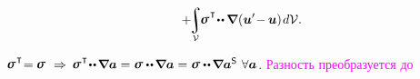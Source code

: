 \begin{multline*}
\begin{gathered}
+ \hspace{-0.3ex}
\scalebox{0.9}{$\displaystyle\integral\displaylimits_{\mathcal{V}}$} \hspace{-0.3ex}
\linearstress^{\hspace{.12ex}\T} \hspace{-0.4ex} \dotdotp \hspace{-0.1ex} \boldnabla \hspace{.1ex} ( \bm{u}' \hspace{-0.4ex} - \hspace{-0.1ex} \bm{u} ) \hspace{.2ex} d\mathcal{V}
.
\end{gathered}\hspace{-1em}
\end{multline*}

\vspace{-0.3em}\noindent
{}  ${\linearstress^{\hspace{.12ex}\T} \hspace{-0.5ex} = \hspace{-0.1ex} \linearstress}$ ${\hspace{.4ex}\Rightarrow\hspace{.2ex}}$ ${\linearstress^{\hspace{.12ex}\T} \hspace{-0.4ex} \dotdotp \hspace{-0.2ex} \boldnabla \bm{a} = \linearstress \dotdotp \hspace{-0.2ex} \boldnabla \bm{a} = \linearstress \dotdotp \hspace{-0.2ex} \boldnabla \bm{a}^{\mathsf{S}} \hspace{.8ex}\forall \bm{a}}$.
\textcolor{magenta}{\foreignlanguage{russian}{Разность преобразуется до}}


